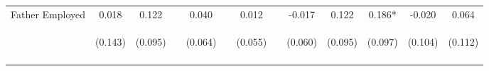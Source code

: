 \begin{tabular}{lcccccccccccc}
\noalign{\smallskip}Father Employed & 0.018 & 0.122 &  & 0.040 &  & 0.012 &  & -0.017 & 0.122 & 0.186* & -0.020 & 0.064\\
 & \begin{footnotesize}(0.143)\end{footnotesize} & \begin{footnotesize}(0.095)\end{footnotesize} & \begin{footnotesize}\end{footnotesize} & \begin{footnotesize}(0.064)\end{footnotesize} & \begin{footnotesize}\end{footnotesize} & \begin{footnotesize}(0.055)\end{footnotesize} & \begin{footnotesize}\end{footnotesize} & \begin{footnotesize}(0.060)\end{footnotesize} & \begin{footnotesize}(0.095)\end{footnotesize} & \begin{footnotesize}(0.097)\end{footnotesize} & \begin{footnotesize}(0.104)\end{footnotesize} & \begin{footnotesize}(0.112)\end{footnotesize}\\
\noalign{\smallskip}\hline\end{tabular}\\
